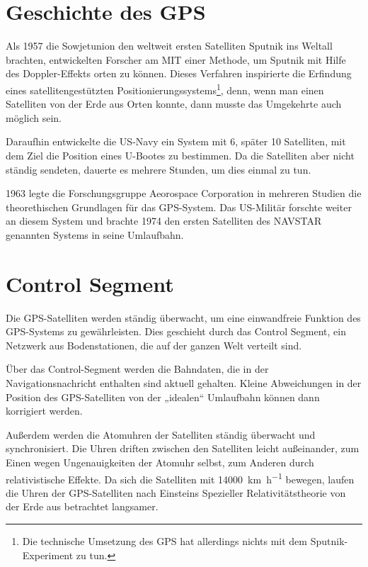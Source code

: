\documentclass[12pt,a4paper]{scrartcl}
\begin{document}
\section{Geschichte des GPS}
\label{sec:history}
Als 1957 die Sowjetunion den weltweit ersten Satelliten Sputnik ins Weltall brachten, entwickelten Forscher am MIT einer Methode, um Sputnik mit Hilfe des Doppler-Effekts orten zu können. Dieses Verfahren inspirierte die Erfindung eines satellitengestützten Positionierungssystems\footnote{Die technische Umsetzung des GPS hat allerdings nichts mit dem Sputnik-Experiment zu tun.}, denn, wenn man einen Satelliten von der Erde aus Orten konnte, dann musste das Umgekehrte auch möglich sein.\cite{tomtom_history}

Daraufhin entwickelte die US-Navy ein System mit 6, später 10 Satelliten, mit dem Ziel die Position eines U-Bootes zu bestimmen. Da die Satelliten aber nicht ständig sendeten, dauerte es mehrere Stunden, um dies einmal zu tun.\cite{techhive_history}

1963 legte die Forschungsgruppe Aeorospace Corporation in mehreren Studien die theorethischen Grundlagen für das GPS-System. Das US-Militär forschte weiter an diesem System und brachte 1974 den ersten Satelliten des NAVSTAR genannten Systems in seine Umlaufbahn.

\section{Control Segment}
\label{sec:control}

Die GPS-Satelliten werden ständig überwacht, um eine einwandfreie Funktion des GPS-Systems zu gewährleisten. Dies geschieht durch das Control Segment, ein Netzwerk aus Bodenstationen, die auf der ganzen Welt verteilt sind.

Über das Control-Segment werden die Bahndaten, die in der Navigationsnachricht enthalten sind aktuell gehalten. Kleine Abweichungen in der Position des GPS-Satelliten von der „idealen“ Umlaufbahn können dann korrigiert werden.

Außerdem werden die Atomuhren der Satelliten ständig überwacht und synchronisiert. Die Uhren driften zwischen den Satelliten leicht außeinander, zum Einen wegen Ungenauigkeiten der Atomuhr selbst, zum Anderen durch relativistische Effekte.
Da sich die Satelliten mit \SI{14000}{\kilo\meter\per\hour} bewegen, laufen die Uhren der GPS-Satelliten nach Einsteins Spezieller Relativitätstheorie von der Erde aus betrachtet langsamer. 
\end{document}
